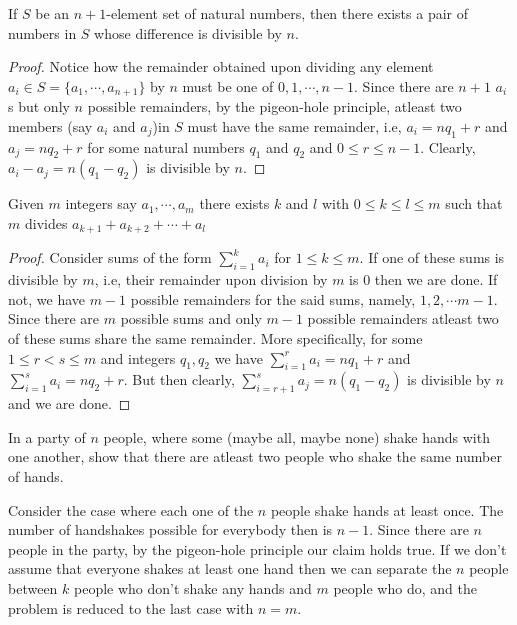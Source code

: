 \begin{claim}
If $S$ be an $n+1$-element set of natural numbers, then there exists a pair of numbers in $S$ whose difference is divisible by $n$.
\end{claim}
\begin{proof}
Notice how the remainder obtained upon dividing any element $a_i\in S=\{a_1,\cdots,a_{n+1}\}$ by $n$ must be one of $0,1,\cdots,n-1$. Since there are $n+1$ $a_i$s but only $n$ possible remainders, by the pigeon-hole principle, atleast two members (say $a_i$ and $a_j$)in $S$ must have the same remainder, i.e, $a_i = nq_1 + r$ and $a_j = nq_2 + r$ for some natural numbers $q_1$ and $q_2$ and $0\leq r\leq n-1$. Clearly, $a_i-a_j = n(q_1-q_2)$ is divisible by $n$.
\end{proof}
\begin{claim}
Given $m$ integers say $a_{1},\cdots,a_{m}$ there exists $k$ and $l$ with  $0\leq k\leq l\leq m$ such that $m$ divides $a_{k+1}+a_{k+2}+\cdots+a_{l}$
\end{claim}
\begin{proof}
Consider sums of the form $\sum_{i=1}^{k}a_i$ for $1\leq k\leq m$. If one of these sums is divisible by $m$, i.e, their remainder upon division by $m$ is $0$ then we are done. If not, we have $m-1$ possible remainders for the said sums, namely, $1,2,\cdots m-1$. Since there are $m$ possible sums and only $m-1$ possible remainders atleast two of these sums share the same remainder. More specifically, for some $1\leq r<s\leq m$ and integers $q_1,q_2$ we have $\sum_{i=1}^{r}a_i = nq_1 + r$ and $\sum_{i=1}^{s}a_i = nq_2 + r$. But then clearly, $\sum_{i=r+1}^{s}a_j = n(q_1-q_2)$ is divisible by $n$ and we are done.
\end{proof}
\begin{question}
In a party of $n$ people, where some (maybe all, maybe none) shake hands with one another, show that there are atleast two people who shake the same number of hands.
\end{question}
\begin{solution}
Consider the case where each one of the $n$ people shake hands at least once. The number of handshakes possible for everybody then is $n-1$. Since there are $n$ people in the party, by the pigeon-hole principle our claim holds true. If we don't assume that everyone shakes at least one hand then we can separate the $n$ people between $k$ people who don't shake any hands and $m$ people who do, and the problem is reduced to the last case with $n=m$.
\end{solution}
